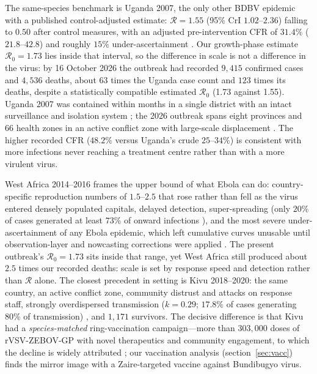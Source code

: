 \documentclass[10pt]{plos}
\newcommand{\Reff}{\mathcal{R}}
\begin{document}
The same-species benchmark is Uganda 2007, the only other BDBV epidemic
with a published control-adjusted estimate: $\Reff=1.55$ (95\% CrI
$1.02$--$2.36$) falling to $0.50$ after control measures, with an
adjusted pre-intervention CFR of $31.4\%$ ($21.8$--$42.8$) and roughly
$15\%$ under-ascertainment \cite{DePadua2026}. Our growth-phase
estimate $\Reff_0=1.73$ lies inside that interval, so the difference in
scale is not a difference in the virus: by 16 October 2026 the outbreak
had recorded $9{,}415$ confirmed cases and $4{,}536$ deaths, about $63$
times the Uganda case count and $123$ times its deaths, despite a
statistically compatible estimated $\Reff_0$ (1.73 against 1.55). Uganda 2007 was contained within
months in a single district with an intact surveillance and isolation
system \cite{Wamala2010}; the 2026 outbreak spans eight provinces and 66
health zones in an active conflict zone with large-scale displacement
\cite{SSHAP2026}. The higher recorded CFR ($48.2\%$ versus Uganda's
crude $25$--$34\%$) is consistent with more infections never reaching a
treatment centre rather than with a more virulent virus.

West Africa 2014--2016 frames the upper bound of what Ebola can do:
country-specific reproduction numbers of $1.5$--$2.5$
\cite{Chowell2004,Nishiura2014} that rose rather than fell as the virus
entered densely populated capitals, delayed detection, super-spreading
(only $20\%$ of cases generated at least $73\%$ of onward infections
\cite{Kucharski2015}), and the most severe under-ascertainment of any
Ebola epidemic, which left cumulative curves unusable until
observation-layer and nowcasting corrections were applied
\cite{Pandey2014,Merler2015}. The present outbreak's $\Reff_0=1.73$
sits inside that range, yet West Africa still produced
about $2.5$ times our recorded deaths: scale is set by response speed
and detection rather than $\Reff$ alone. The closest precedent in
setting is Kivu 2018--2020: the same country, an active conflict zone,
community distrust and attacks on response staff, strongly overdispersed
transmission ($k=0.29$; $17.8\%$ of cases generating $80\%$ of
transmission) \cite{Soubrier2026}, and $1{,}171$ survivors. The decisive
difference is that Kivu had a \emph{species-matched} ring-vaccination
campaign---more than $303{,}000$ doses of rVSV-ZEBOV-GP with novel
therapeutics and community engagement, to which the decline is widely
attributed \cite{WHOKivu2020}; our vaccination analysis
(section~\ref{sec:vacc}) finds the mirror image with a Zaire-targeted
vaccine against Bundibugyo virus.
\end{document}

